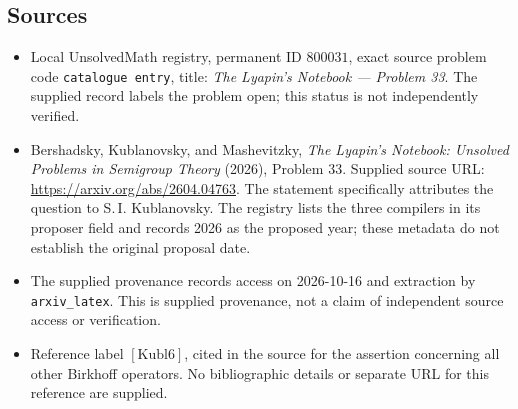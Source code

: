 \documentclass[11pt]{article}
\begin{document}
\subsection{Sources}
\begin{itemize}
\item Local UnsolvedMath registry, permanent ID \(800031\), exact source problem code \texttt{catalogue entry}, title: \emph{The Lyapin's Notebook --- Problem 33}. The supplied record labels the problem open; this status is not independently verified.
\item Bershadsky, Kublanovsky, and Mashevitzky, \emph{The Lyapin's Notebook: Unsolved Problems in Semigroup Theory} (2026), Problem 33. Supplied source URL: \url{https://arxiv.org/abs/2604.04763}. The statement specifically attributes the question to S.\,I. Kublanovsky. The registry lists the three compilers in its proposer field and records 2026 as the proposed year; these metadata do not establish the original proposal date.
\item The supplied provenance records access on 2026-10-16 and extraction by \texttt{arxiv\_latex}. This is supplied provenance, not a claim of independent source access or verification.
\item Reference label \([\mathrm{Kubl6}]\), cited in the source for the assertion concerning all other Birkhoff operators. No bibliographic details or separate URL for this reference are supplied.
\end{itemize}
\end{document}
